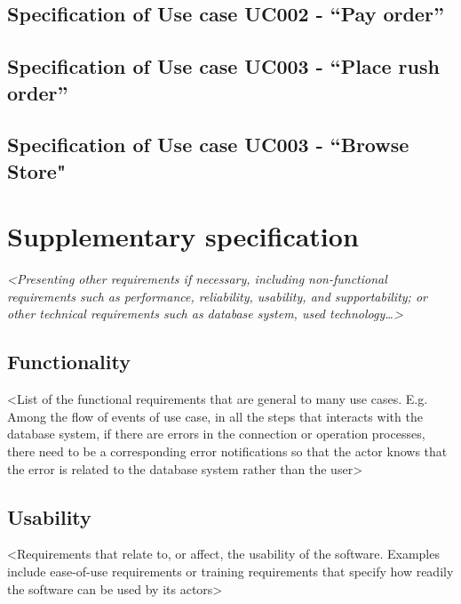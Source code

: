 \documentclass[letterpaper]{report}
\begin{document}
\section[Specification of Use case UC002 {}- “Pay order”]{Specification of Use case UC002 - “Pay order”}


\section[Specification of Use case UC003 {}- “Place rush order”]{Specification of Use case UC003 - “Place rush order”}


\section[Specification of Use case UC004 {}- “Browse Store”]{Specification of Use case UC003 - “Browse Store"}



\chapter{Supplementary specification}
\textit{{\textless}Presenting other requirements if necessary, including non-functional requirements such as performance, reliability, usability, and supportability; or other technical requirements such as database system, used technology…{\textgreater}}

\section{Functionality}
 {\textless}List of the functional requirements that are general to many use cases. E.g. Among the flow of events of use case, in all the steps that interacts with the database system, if there are errors in the connection or operation processes, there need to be a corresponding error notifications so that the actor knows that the error is related to the database system rather than the user{\textgreater}

\section{Usability}
 {\textless}Requirements that relate to, or affect, the usability of the software. Examples include ease-of-use requirements or training requirements that specify how readily the software can be used by its actors{\textgreater}
\end{document}

